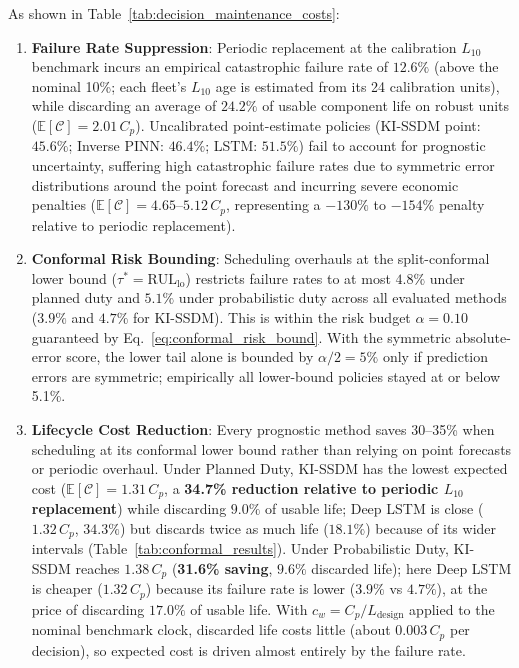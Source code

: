 \documentclass[a4paper,fleqn]{cas-dc}
\begin{document}
As shown in Table~\ref{tab:decision_maintenance_costs}:
\begin{enumerate}[label=(\alph*),leftmargin=2.2em]
    \item \textbf{Failure Rate Suppression}: Periodic replacement at the calibration $L_{10}$ benchmark incurs an empirical catastrophic failure rate of $12.6\%$ (above the nominal 10\%; each fleet's $L_{10}$ age is estimated from its 24 calibration units), while discarding an average of $24.2\%$ of usable component life on robust units ($\mathbb{E}[\mathcal{C}] = 2.01\,C_p$). Uncalibrated point-estimate policies (KI-SSDM point: $45.6\%$; Inverse PINN: $46.4\%$; LSTM: $51.5\%$) fail to account for prognostic uncertainty, suffering high catastrophic failure rates due to symmetric error distributions around the point forecast and incurring severe economic penalties ($\mathbb{E}[\mathcal{C}] = 4.65\text{--}5.12\,C_p$, representing a $-130\%$ to $-154\%$ penalty relative to periodic replacement).
    \item \textbf{Conformal Risk Bounding}: Scheduling overhauls at the split-conformal lower bound ($\tau^* = \mathrm{RUL}_{\mathrm{lo}}$) restricts failure rates to at most $4.8\%$ under planned duty and $5.1\%$ under probabilistic duty across all evaluated methods ($3.9\%$ and $4.7\%$ for KI-SSDM). This is within the risk budget $\alpha = 0.10$ guaranteed by Eq.~\eqref{eq:conformal_risk_bound}. With the symmetric absolute-error score, the lower tail alone is bounded by $\alpha/2 = 5\%$ only if prediction errors are symmetric; empirically all lower-bound policies stayed at or below 5.1\%.
    \item \textbf{Lifecycle Cost Reduction}: Every prognostic method saves 30--35\% when scheduling at its conformal lower bound rather than relying on point forecasts or periodic overhaul. Under Planned Duty, KI-SSDM has the lowest expected cost ($\mathbb{E}[\mathcal{C}] = 1.31\,C_p$, a \textbf{34.7\% reduction relative to periodic $L_{10}$ replacement}) while discarding $9.0\%$ of usable life; Deep LSTM is close ($1.32\,C_p$, $34.3\%$) but discards twice as much life ($18.1\%$) because of its wider intervals (Table~\ref{tab:conformal_results}). Under Probabilistic Duty, KI-SSDM reaches $1.38\,C_p$ (\textbf{31.6\% saving}, $9.6\%$ discarded life); here Deep LSTM is cheaper ($1.32\,C_p$) because its failure rate is lower ($3.9\%$ vs $4.7\%$), at the price of discarding $17.0\%$ of usable life. With $c_w = C_p/L_{\mathrm{design}}$ applied to the nominal benchmark clock, discarded life costs little (about $0.003\,C_p$ per decision), so expected cost is driven almost entirely by the failure rate.
\end{enumerate}
\end{document}
